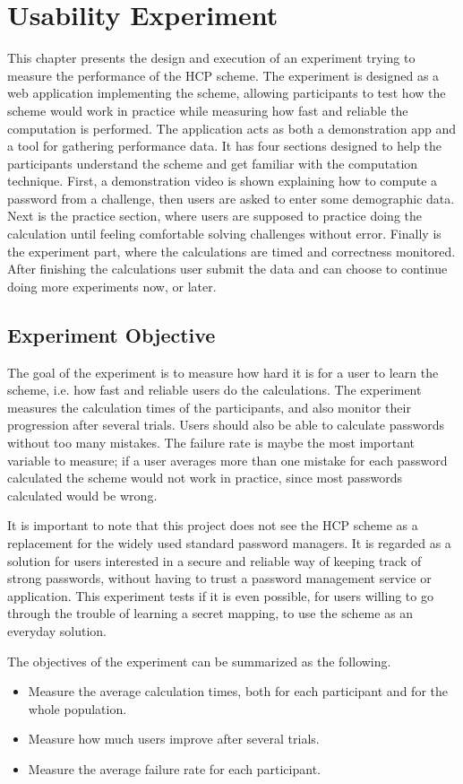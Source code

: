 \chapter{Usability Experiment}\label{ch:experiment}
This chapter presents the design and execution of an experiment trying to measure  the performance of the HCP scheme. The experiment is designed as a web application implementing the scheme, allowing participants to test how the scheme would work in practice while measuring how fast and reliable the computation is performed. The application acts as both a demonstration app and a tool for gathering performance data. It has four sections designed to help the participants understand the scheme and get familiar with the computation technique. First, a demonstration video is shown explaining how to compute a password from a challenge, then users are asked to enter some demographic data. Next is the practice section, where users are supposed to practice doing the calculation until feeling comfortable solving challenges without error. Finally is the experiment part, where the calculations are timed and correctness monitored. After finishing the calculations user submit the data and can choose to continue doing more experiments now, or later.
\section{Experiment Objective}
The goal of the experiment is to measure how hard it is for a user to learn the scheme, i.e. how fast and reliable users do the calculations. The experiment measures the calculation times of the participants, and also monitor their progression after several trials. Users should also be able to calculate passwords without too many mistakes. The failure rate is maybe the most important variable to measure; if a user averages more than one mistake for each password calculated the scheme would not work in practice, since most passwords calculated would be wrong. 
\par It is important to note that this project does not see the HCP scheme as a replacement for the widely used standard password managers. It is regarded as a solution for users interested in a secure and reliable way of keeping track of strong passwords, without having to trust a password management service or application. This experiment tests if it is even possible, for users willing to go through the trouble of learning a secret mapping, to use the scheme as an everyday solution.

\par The objectives of the experiment can be summarized as the following.
\begin{itemize}
    \item Measure the average calculation times, both for each participant and for the whole population.
    \item Measure how much users improve after several trials.
    \item Measure the average failure rate for each participant.
\end{itemize}


